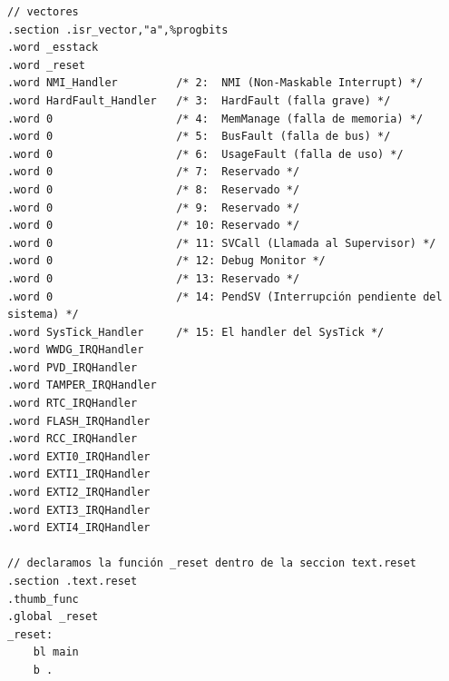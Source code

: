 \begin{lstlisting}[language=ARMasm]
// vectores 
.section .isr_vector,"a",%progbits
.word _esstack
.word _reset
.word NMI_Handler         /* 2:  NMI (Non-Maskable Interrupt) */
.word HardFault_Handler   /* 3:  HardFault (falla grave) */
.word 0                   /* 4:  MemManage (falla de memoria) */
.word 0                   /* 5:  BusFault (falla de bus) */
.word 0                   /* 6:  UsageFault (falla de uso) */
.word 0                   /* 7:  Reservado */
.word 0                   /* 8:  Reservado */
.word 0                   /* 9:  Reservado */
.word 0                   /* 10: Reservado */
.word 0                   /* 11: SVCall (Llamada al Supervisor) */
.word 0                   /* 12: Debug Monitor */
.word 0                   /* 13: Reservado */
.word 0                   /* 14: PendSV (Interrupción pendiente del sistema) */
.word SysTick_Handler     /* 15: El handler del SysTick */
.word WWDG_IRQHandler
.word PVD_IRQHandler
.word TAMPER_IRQHandler
.word RTC_IRQHandler
.word FLASH_IRQHandler
.word RCC_IRQHandler
.word EXTI0_IRQHandler
.word EXTI1_IRQHandler
.word EXTI2_IRQHandler
.word EXTI3_IRQHandler
.word EXTI4_IRQHandler

// declaramos la función _reset dentro de la seccion text.reset
.section .text.reset
.thumb_func
.global _reset
_reset:
    bl main
    b .
    

\end{lstlisting}
